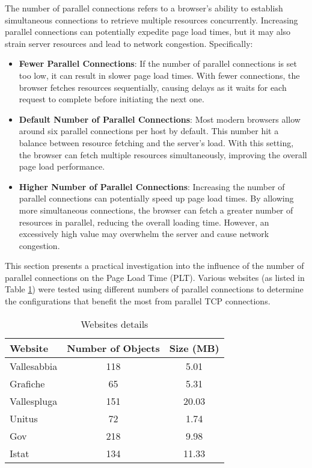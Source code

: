 The number of parallel connections refers to a browser's ability to establish simultaneous connections to retrieve 
multiple resources concurrently. Increasing parallel connections can potentially expedite page load times, but it may 
also strain server resources and lead to network congestion. Specifically:

\begin{itemize}[leftmargin=10pt]
\item \textbf{Fewer Parallel Connections}: If the number of parallel connections is set too low, it can result in
 slower page load times. With fewer connections, the browser fetches resources sequentially, causing delays as it waits
 for each request to complete before initiating the next one.
\item \textbf{Default Number of Parallel Connections}: Most modern browsers allow around six parallel connections per
 host by default. This number hit a balance between resource fetching and the server's load. With this setting, the 
 browser can fetch multiple resources simultaneously, improving the overall page load performance. 
\item \textbf{Higher Number of Parallel Connections}: Increasing the number of parallel connections can potentially
 speed up page load times. By allowing more simultaneous connections, the browser can fetch a greater number of 
 resources in parallel, reducing the overall loading time. However, an excessively high value may overwhelm the 
 server and cause network congestion.
\end{itemize}
\noindent
This section presents a practical investigation into the influence of the number of parallel connections on the Page Load Time (PLT). 
Various websites (as listed in Table \ref{tab:websites_details}) were tested using different numbers of parallel connections 
to determine the configurations that benefit the most from parallel TCP connections.

    \begin{table}[H]
        \small
    \centering
        \begin{tabular}{|l|c|c|}
        \hline
        \rowcolor{pyblue!60}
        \textbf{Website} & \textbf{Number of Objects} & \textbf{Size (MB)} \\
        \hline
        Vallesabbia & 118 & 5.01 \\
        Grafiche & 65 & 5.31 \\
        Vallespluga & 151 & 20.03 \\
        Unitus & 72 & 1.74 \\
        Gov & 218 & 9.98 \\
        Istat & 134 & 11.33 \\
        \hline
        \end{tabular}
        \caption{\small Websites details}
        \label{tab:websites_details}
    \end{table}


